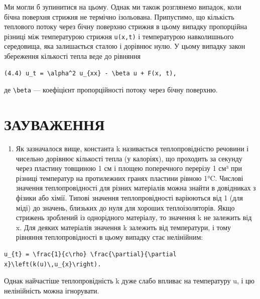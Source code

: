 \documentclass[
  ukrainian,
]{article}
\providecommand{\tightlist}{%
  \setlength{\itemsep}{0pt}\setlength{\parskip}{0pt}}
\begin{document}
Ми могли б зупинитися на цьому. Однак ми також розглянемо випадок, коли
бічна поверхня стрижня не термічно ізольована. Припустимо, що кількість
теплового потоку через бічну поверхню стрижня в цьому випадку
пропорційна різниці між температурою стрижня \texttt{u(x,t)} і
температурою навколишнього середовища, яка залишається сталою і дорівнює
нулю. У цьому випадку закон збереження кількості тепла веде до рівняння

\begin{verbatim}
(4.4) u_t = \alpha^2 u_{xx} - \beta u + F(x, t),
\end{verbatim}

де \texttt{\textbackslash{}beta} --- коефіцієнт пропорційності потоку
через бічну поверхню.

\section{ЗАУВАЖЕННЯ}\label{ux437ux430ux443ux432ux430ux436ux435ux43dux43dux44f-1}

\begin{enumerate}
\def\labelenumi{\arabic{enumi}.}
\tightlist
\item
  Як зазначалося вище, константа k називається теплопровідністю речовини
  і чисельно дорівнює кількості тепла (у калоріях), що проходить за
  секунду через пластину товщиною 1 см і площею поперечного перерізу 1
  см³ при різниці температур на протилежних гранях пластини рівною 1°C.
  Числові значення теплопровідності для різних матеріалів можна знайти в
  довідниках з фізики або хімії. Типові значення теплопровідності
  варіюються від 1 (для міді) до значень, близьких до нуля для хороших
  теплоізоляторів. Якщо стрижень зроблений із однорідного матеріалу, то
  значення k не залежить від x. Для деяких матеріалів значення k
  залежить від температури, і тому рівняння теплопровідності в цьому
  випадку стає нелінійним:
\end{enumerate}

\begin{verbatim}
u_{t} = \frac{1}{c\rho} \frac{\partial}{\partial x}\left(k(u)\,u_{x}\right).
\end{verbatim}

Однак найчастіше теплопровідність k дуже слабо впливає на температуру u,
і цю нелінійність можна ігнорувати.
\end{document}

